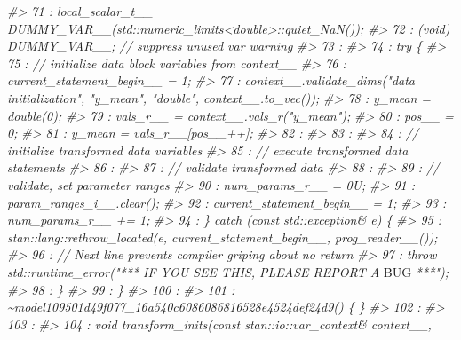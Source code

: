 \documentclass[
  10pt,
  italian,
  a4paper,
  extrafontsizes,onecolumn,openright
  ]{memoir}
\newenvironment{Shaded}{\begin{snugshade}}{\end{snugshade}}
\newcommand{\AlertTok}[1]{\textcolor[rgb]{0.94,0.16,0.16}{#1}}
\newcommand{\CommentTok}[1]{\textcolor[rgb]{0.56,0.35,0.01}{\textit{#1}}}
\begin{document}
\begin{Shaded}
\begin{Highlighting}[]
\CommentTok{\#\textgreater{}   71 :         local\_scalar\_t\_\_ DUMMY\_VAR\_\_(std::numeric\_limits\textless{}double\textgreater{}::quiet\_NaN());}
\CommentTok{\#\textgreater{}   72 :         (void) DUMMY\_VAR\_\_;  // suppress unused var warning}
\CommentTok{\#\textgreater{}   73 : }
\CommentTok{\#\textgreater{}   74 :         try \{}
\CommentTok{\#\textgreater{}   75 :             // initialize data block variables from context\_\_}
\CommentTok{\#\textgreater{}   76 :             current\_statement\_begin\_\_ = 1;}
\CommentTok{\#\textgreater{}   77 :             context\_\_.validate\_dims("data initialization", "y\_mean", "double", context\_\_.to\_vec());}
\CommentTok{\#\textgreater{}   78 :             y\_mean = double(0);}
\CommentTok{\#\textgreater{}   79 :             vals\_r\_\_ = context\_\_.vals\_r("y\_mean");}
\CommentTok{\#\textgreater{}   80 :             pos\_\_ = 0;}
\CommentTok{\#\textgreater{}   81 :             y\_mean = vals\_r\_\_[pos\_\_++];}
\CommentTok{\#\textgreater{}   82 : }
\CommentTok{\#\textgreater{}   83 : }
\CommentTok{\#\textgreater{}   84 :             // initialize transformed data variables}
\CommentTok{\#\textgreater{}   85 :             // execute transformed data statements}
\CommentTok{\#\textgreater{}   86 : }
\CommentTok{\#\textgreater{}   87 :             // validate transformed data}
\CommentTok{\#\textgreater{}   88 : }
\CommentTok{\#\textgreater{}   89 :             // validate, set parameter ranges}
\CommentTok{\#\textgreater{}   90 :             num\_params\_r\_\_ = 0U;}
\CommentTok{\#\textgreater{}   91 :             param\_ranges\_i\_\_.clear();}
\CommentTok{\#\textgreater{}   92 :             current\_statement\_begin\_\_ = 1;}
\CommentTok{\#\textgreater{}   93 :             num\_params\_r\_\_ += 1;}
\CommentTok{\#\textgreater{}   94 :         \} catch (const std::exception\& e) \{}
\CommentTok{\#\textgreater{}   95 :             stan::lang::rethrow\_located(e, current\_statement\_begin\_\_, prog\_reader\_\_());}
\CommentTok{\#\textgreater{}   96 :             // Next line prevents compiler griping about no return}
\CommentTok{\#\textgreater{}   97 :             throw std::runtime\_error("*** IF YOU SEE THIS, PLEASE REPORT A }\AlertTok{BUG}\CommentTok{ ***");}
\CommentTok{\#\textgreater{}   98 :         \}}
\CommentTok{\#\textgreater{}   99 :     \}}
\CommentTok{\#\textgreater{}  100 : }
\CommentTok{\#\textgreater{}  101 :     \textasciitilde{}model109501d49f077\_16a540c6086086816528e4524def24d9() \{ \}}
\CommentTok{\#\textgreater{}  102 : }
\CommentTok{\#\textgreater{}  103 : }
\CommentTok{\#\textgreater{}  104 :     void transform\_inits(const stan::io::var\_context\& context\_\_,}

\end{Highlighting}
\end{Shaded}
\end{document}
